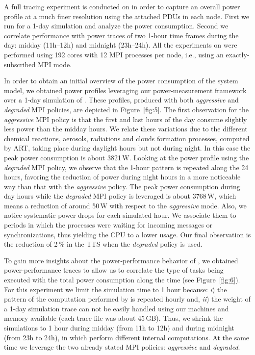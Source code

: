 A full tracing  experiment is conducted on \tinto  in order to capture
an overall power profile at a much finer resolution using the attached
PDUs in each  node. First we run \cosmoart for  a 1-day simulation and
analyze the  power consumption.  Second we  correlate performance with
power  traces  of  two  1-hour  time frames  during  the  day:  midday
(11h--12h) and midnight (23h--24h). All the experiments on \tinto were
performed using 192 cores with  12 MPI processes per node, i.e., using
an exactly-subscribed MPI mode.

In order to obtain an initial overview of the power consumption of the
system  model,  we  obtained  power  profiles  leveraging  our  \pmlib
power-measurement    framework   over    a    1-day   simulation    of
\cosmoart.  These profiles, produced  with both  \emph{aggressive} and
\emph{degraded} MPI policies,  are depicted in Figure~\ref{fig:5}. The
first  observation for the  \emph{aggressive} MPI  policy is  that the
first and last  hours of the day consume slightly  less power than the
midday  hours.   We  relate  these  variations due  to  the  different
chemical   reactions,  aerosols,   radiations  and   clouds  formation
processes, computed by ART, taking place during daylight hours but not
during  night.  In this  case  the  peak  power consumption  is  about
3821\,W. Looking  at the power  profile using the  \emph{degraded} MPI
policy, we  observe that the 1-hour  pattern is repeated  along the 24
hours, favoring  the reduction of power  during night hours  in a more
noticeable way than that  with the \emph{aggressive} policy.  The peak
power  consumption  during day  hours  while  the \emph{degraded}  MPI
policy  is leveraged  is about  3768\,W,  which means  a reduction  of
around  50\,W with  respect to  the \emph{aggressive}  mode.  Also, we
notice systematic  power drops for each simulated  hour.  We associate
them  to periods  in which  the  processes were  waiting for  incoming
messages  or  synchronizations,  thus  yielding  the CPU  to  a  lower
usage. Our final observation is the reduction of 2\,\% in the TTS when
the \emph{degraded} policy is used.

To  gain  more  insights   about  the  power-performance  behavior  of
\cosmoart, we  obtained power-per\-for\-man\-ce traces to  allow us to
correlate  the type  of  tasks  being executed  with  the total  power
consumption  along  the   time  (see  Figure~\ref{fig:6}).   For  this
experiment we limit  the simulation time to 1  hour because: \emph{i})
the  pattern of  the computation  performed by  \cosmoart  is repeated
hourly and, \emph{ii}) the weight  of a 1-day simulation trace can not
be easily handled using our  machines and memory available (each trace
file was  about 45\,GB).   Thus, we shrink  the simulations to  1 hour
during midday (from 11h to 12h) and during midnight (from 23h to 24h),
in which  \cosmoart perform  different internal computations.   At the
same  time   we  leverage  the   two  already  stated   MPI  policies:
\emph{aggressive} and \emph{degraded}.

